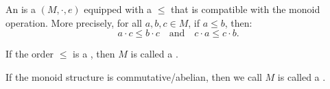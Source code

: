 \begin{definition} \label{definition:ordered_monoid}
An  is a  $(M, \cdot, e)$ equipped with a  $\le$ that is compatible with the monoid operation. More precisely, for all $a, b, c \in M$, if $a \le b$, then:
$$a \cdot c \le b \cdot c \quad \text{and} \quad c \cdot a \le c \cdot b.$$

If the order $\le$ is a , then $M$ is called a .

If the monoid structure is commutative/abelian, then we call $M$ is called a .
\end{definition}
